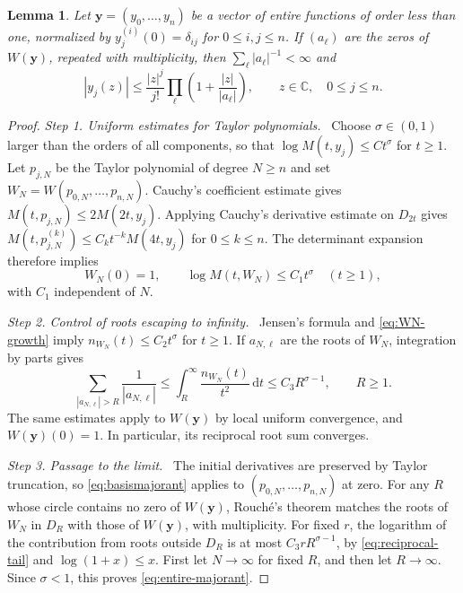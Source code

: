 \documentclass[11pt,letterpaper,reqno]{amsart}
\newtheorem{lem}[thm]{Lemma}
\theoremstyle{remark}
\numberwithin{equation}{section}
\newcommand{\C}{\mathbb C}
\newcommand{\yv}{\bm y}
\newcommand{\step}[1]{\medskip\noindent\emph{#1}\ }
\begin{document}
\begin{lem}\label{lem:entire-majorant}
Let $\yv=(y_0,\ldots,y_n)$ be a vector of entire functions of order less
than one, normalized by $y_j^{(i)}(0)=\delta_{ij}$ for $0\le i,j\le n$.
If $(a_\ell)$ are the zeros of $W(\yv)$, repeated with multiplicity, then
$\sum_\ell|a_\ell|^{-1}<\infty$ and
\begin{equation}\label{eq:entire-majorant}
 |y_j(z)|\le\frac{|z|^j}{j!}
        \prod_\ell\left(1+\frac{|z|}{|a_\ell|}\right),
 \qquad z\in\C,\quad 0\le j\le n.
\end{equation}
\end{lem}
\begin{proof}
\step{Step 1. Uniform estimates for Taylor polynomials.}
Choose $\sigma\in(0,1)$ larger than the orders of all components, so that
$\log M(t,y_j)\le Ct^\sigma$ for $t\ge1$. Let $p_{j,N}$ be the Taylor
polynomial of degree $N\geq n$ and set
$W_N=W(p_{0,N},\ldots,p_{n,N})$. Cauchy's coefficient estimate gives
$M(t,p_{j,N})\le2M(2t,y_j)$. Applying Cauchy's derivative estimate on
$D_{2t}$ gives
$M(t,p_{j,N}^{(k)})\le C_kt^{-k}M(4t,y_j)$ for $0\le k\le n$.
The determinant expansion therefore implies
\begin{equation}\label{eq:WN-growth}
 W_N(0)=1,\qquad \log M(t,W_N)\le C_1t^\sigma\quad(t\ge1),
\end{equation}
with $C_1$ independent of $N$.

\step{Step 2. Control of roots escaping to infinity.}
Jensen's formula and \eqref{eq:WN-growth} imply
$n_{W_N}(t)\le C_2t^\sigma$ for $t\ge1$. If $a_{N,\ell}$ are the roots
of $W_N$, integration by parts gives
\begin{equation}\label{eq:reciprocal-tail}
 \sum_{|a_{N,\ell}|>R}\frac1{|a_{N,\ell}|}
 \le\int_R^\infty\frac{n_{W_N}(t)}{t^2}\,\mathrm dt
 \le C_3R^{\sigma-1},\qquad R\ge1.
\end{equation}
The same estimates apply to $W(\yv)$ by local uniform convergence, and
$W(\yv)(0)=1$. In particular, its reciprocal root sum converges.

\step{Step 3. Passage to the limit.}
The initial derivatives are preserved by Taylor truncation, so
\eqref{eq:basismajorant} applies to $(p_{0,N},\ldots,p_{n,N})$ at zero.
For any $R$ whose circle contains no zero of $W(\yv)$, Rouch\'e's theorem
matches the roots of $W_N$ in $D_R$ with those of $W(\yv)$, with
multiplicity. For fixed $r$, the logarithm of the contribution from roots
outside $D_R$ is at most $C_3rR^{\sigma-1}$, by
\eqref{eq:reciprocal-tail} and $\log(1+x)\le x$.
First let $N\to\infty$ for fixed $R$, and then let $R\to\infty$.
Since $\sigma<1$, this proves \eqref{eq:entire-majorant}.
\end{proof}
\end{document}
